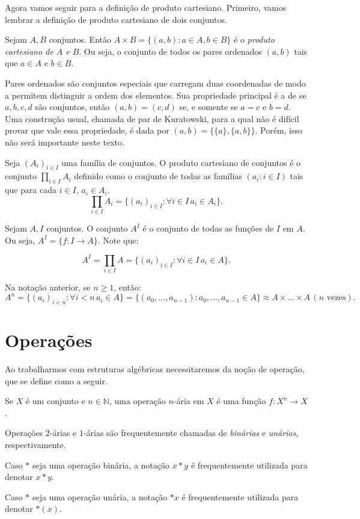 Agora vamos seguir para a definição de produto cartesiano.
Primeiro, vamos lembrar a definição de produto cartesiano de dois conjuntos.

\begin{definition}
    Sejam $A, B$ conjuntos. Então $A\times B=\{(a, b): a\in A, b \in B\}$ é o \emph{produto cartesiano de $A$ e $B$}.
    Ou seja, o conjunto de todos os pares ordenados $(a, b)$ tais que $a\in A$ e $b\in B$.
\end{definition}

Pares ordenados são conjuntos especiais que carregam duas coordenadas de modo a permitem distinguir a ordem dos elementos.
Sua propriedade principal é a de se $a, b, c, d$ são conjuntos, então $(a, b)=(c, d)$ se, e somente se $a=c$ e $b=d$.
Uma construção usual, chamada de par de Kuratowski, para a qual não é difícil provar que vale essa propriedade, é dada por $(a, b)=\{\{a\}, \{a, b\}\}$. Porém, isso não será importante neste texto.


\begin{definition}
Seja $(A_i)_{i \in I}$ uma família de conjuntos.
O produto cartesiano de conjuntos é o conjunto $\prod_{i \in I} A_i$ definido como o conjunto de todas as famílias $(a_i: i \in I)$ tais que para cada $i \in I$, $a_i \in A_i$.
\[\prod_{i \in I} A_i=\{(a_i)_{i \in I}: \forall i \in I\, a_i \in A_i\}.\]
\end{definition}


\begin{definition}
    Sejam $A, I$ conjuntos.
    O conjunto $A^I$ é o conjunto de todas as funções de $I$ em $A$. Ou seja, $A^I=\{f:I\rightarrow A\}$.
    Note que:

    \[A^I=\prod_{i \in I}A=\{(a_i)_{i \in I}: \forall i \in I\,  a_i\in A\}.\]
    \end{definition}

    Na notação anterior, se $n\geq 1$, então:
    \[A^n=\{(a_i)_{i<n}:\forall i<n\, a_i \in A\}=\{(a_0, \dots, a_{n-1}):a_0, \dots, a_{n-1}\in A\}\approx A\times \dots \times A \,(n \text{ vezes}).\]

    \section{Operações}
Ao trabalharmos com estruturas algébricas necessitaremos da noção de operação, que se define como a seguir.
\begin{definition}
    Se $X$ é um conjunto e $n \in \mathbb N$, uma operação $n$-ária em $X$ é uma função $f:X^n\rightarrow X$.
\end{definition}

Operações $2$-árias e $1$-árias são frequentemente chamadas de \emph{binárias} e \emph{unárias}, respectivamente.

Caso $*$ seja uma operação binária, a notação $x*y$ é frequentemente utilizada para denotar $x*y$.

Caso $*$ seja uma operação unária, a notação $*x$ é frequentemente utilizada para denotar $*(x)$.
